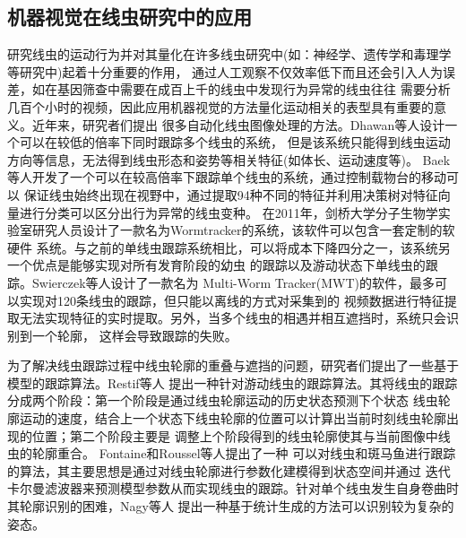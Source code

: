 	
\subsection{机器视觉在线虫研究中的应用}
\label{sec:intro:analog}
	研究线虫的运动行为并对其量化在许多线虫研究中(如：神经学、遗传学和毒理学等研究中)起着十分重要的作用，
	通过人工观察不仅效率低下而且还会引入人为误差，如在基因筛查中需要在成百上千的线虫中发现行为异常的线虫往往
	需要分析几百个小时的视频，因此应用机器视觉的方法量化运动相关的表型具有重要的意义。近年来，研究者们提出
	很多自动化线虫图像处理的方法。Dhawan等人\cite{De1998Natural}设计一个可以在较低的倍率下同时跟踪多个线虫的系统，
	但是该系统只能得到线虫运动方向等信息，无法得到线虫形态和姿势等相关特征(如体长、运动速度等)。
	Baek等人\cite{Baek2002Using}开发了一个可以在较高倍率下跟踪单个线虫的系统，通过控制载物台的移动可以
	保证线虫始终出现在视野中，通过提取94种不同的特征并利用决策树对特征向量进行分类可以区分出行为异常的线虫变种。
	在2011年，剑桥大学分子生物学实验室研究人员设计了一款名为Wormtracker的系统，该软件可以包含一套定制的软硬件
	系统\cite{yemini2013high}。与之前的单线虫跟踪系统相比，可以将成本下降四分之一，该系统另一个优点是能够实现对所有发育阶段的幼虫
	的跟踪以及游动状态下单线虫的跟踪。Swierczek等人\cite{swierczek2011high}设计了一款名为
	Multi-Worm Tracker(MWT)的软件，最多可以实现对120条线虫的跟踪，但只能以离线的方式对采集到的
	视频数据进行特征提取无法实现特征的实时提取。另外，当多个线虫的相遇并相互遮挡时，系统只会识别到一个轮廓，
	这样会导致跟踪的失败。
	
	为了解决线虫跟踪过程中线虫轮廓的重叠与遮挡的问题，研究者们提出了一些基于模型的跟踪算法。Restif等人\cite{restif2008tracking}
	提出一种针对游动线虫的跟踪算法。其将线虫的跟踪分成两个阶段：第一个阶段是通过线虫轮廓运动的历史状态预测下个状态
	线虫轮廓运动的速度，结合上一个状态下线虫轮廓的位置可以计算出当前时刻线虫轮廓出现的位置；第二个阶段主要是
	调整上个阶段得到的线虫轮廓使其与当前图像中线虫的轮廓重合。 Fontaine和Roussel等人\cite{fontaine2007model,roussel2014robust}提出了一种
	可以对线虫和斑马鱼进行跟踪的算法，其主要思想是通过对线虫轮廓进行参数化建模得到状态空间并通过
	迭代卡尔曼滤波器来预测模型参数从而实现线虫的跟踪。针对单个线虫发生自身卷曲时其轮廓识别的困难，Nagy等人
	\cite{nagy2015generative}提出一种基于统计生成的方法可以识别较为复杂的姿态。
	
